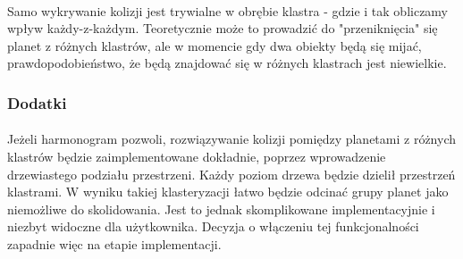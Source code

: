 \paragraph{}

Samo wykrywanie kolizji jest trywialne w obrębie klastra - gdzie i tak obliczamy wpływ każdy-z-każdym. Teoretycznie może to prowadzić do "przeniknięcia" się planet z różnych klastrów, ale w momencie gdy dwa obiekty będą się mijać, prawdopodobieństwo, że będą znajdować się w różnych klastrach jest niewielkie.

\subsubsection{Dodatki}\label{alg:additions}

\paragraph{}
Jeżeli harmonogram pozwoli, rozwiązywanie kolizji pomiędzy planetami z różnych klastrów będzie zaimplementowane dokładnie, poprzez wprowadzenie drzewiastego podziału przestrzeni. Każdy poziom drzewa będzie dzielił przestrzeń klastrami. W wyniku takiej klasteryzacji łatwo będzie odcinać grupy planet jako niemożliwe do skolidowania. Jest to jednak skomplikowane implementacyjnie i niezbyt widoczne dla użytkownika. Decyzja o włączeniu tej funkcjonalności zapadnie więc na etapie implementacji.
